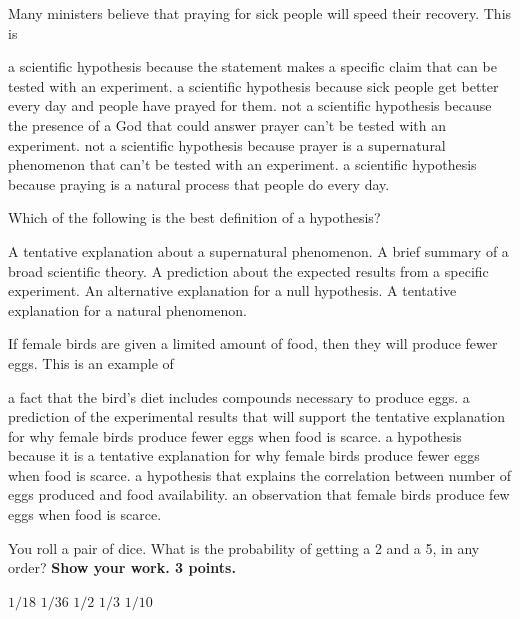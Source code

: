 \newpage

\question
Many ministers believe that praying for sick people will speed their recovery.  This is

\begin{choices}
\correctchoice a scientific hypothesis because the statement makes a specific claim that can be tested with an experiment.
\choice a scientific hypothesis because sick people get better every day and people have prayed for them.
\choice not a scientific hypothesis because the presence of a God that could answer prayer can't be tested with an experiment.
\choice not a scientific hypothesis because prayer is a supernatural phenomenon that can't be tested with an experiment.
\choice a scientific hypothesis because praying is a natural process that people do every day.
\end{choices}

\question
Which of the following is the best definition of a hypothesis?

\begin{choices}
\choice A tentative explanation about a supernatural phenomenon.
\choice A brief summary of a broad scientific theory.
\choice A prediction about the expected results from a specific experiment.
\choice An alternative explanation for a null hypothesis.
\correctchoice A tentative explanation for a natural phenomenon.
\end{choices}

\question
If female birds are given a limited amount of food, then they will produce fewer eggs.  This is an example of

\begin{choices}
\choice a fact that the bird's diet includes compounds necessary to produce eggs.
\correctchoice a prediction of the experimental results that will support the tentative explanation for why female birds produce fewer eggs when food is scarce.
\choice a hypothesis because it is a tentative explanation for why female birds produce fewer eggs when food is scarce.
\choice a hypothesis that explains the correlation between number of eggs produced and food availability.
\choice an observation that female birds produce few eggs when food is scarce.
\end{choices}

\question
You roll a pair of dice.  What is the probability of getting a 2 and a 5, in any order? \textbf{Show your work.  3 points.}

\begin{choices}
\correctchoice $1/18$
\choice $1/36$
\choice $1/2$
\choice $1/3$
\choice $1/10$
\end{choices}

